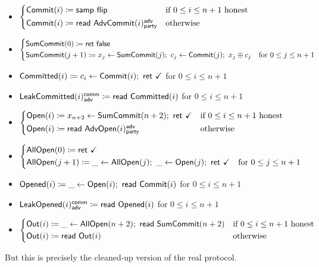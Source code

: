 \begin{itemize}
\item {\color{blue} $\begin{cases*} \Commit(i) \coloneqq \samp{\flip} & \text{if $0 \leq i \leq n+1$ honest} \\ \Commit(i) \coloneqq \read{\AdvCommit(i)^\adv_\party} & \text{otherwise} \end{cases*}$}
\item {\color{blue} $\begin{cases*} \SumCommit(0) \coloneqq \ret{\false} & \\ \SumCommit(j+1) \coloneqq x_j \leftarrow \SumCommit(j); \ c_j \leftarrow \Commit(j); \ x_j \oplus c_j & \text{for $0 \leq j \leq n+1$} \end{cases*}$}
\item {\color{magenta} $\mathsf{Committed}(i) \coloneqq c_i \leftarrow \mathsf{Commit}(i); \ \mathsf{ret} \ \checkmark$ for $0 \leq i \leq n+1$}
\item {\color{magenta} $\mathsf{LeakCommitted}(i)^{\mathsf{comm}}_{\mathsf{adv}} \coloneqq \mathsf{read} \ \mathsf{Committed}(i)$ for $0 \leq i \leq n+1$}
\item {\color{teal} $\begin{cases*} \Open(i) \coloneqq x_{n+2} \leftarrow \SumCommit(n+2); \ \ret{\checkmark} & \text{if $0 \leq i \leq n+1$ honest} \\ \Open(i) \coloneqq \read{\AdvOpen(i)^\adv_\party} & \text{otherwise} \end{cases*}$}
\item {\color{teal} $\begin{cases*} \AllOpen(0) \coloneqq \ret{\checkmark} & \\ \AllOpen(j+1) \coloneqq \_ \leftarrow \AllOpen(j); \ \_ \leftarrow \Open(j); \ \ret{\checkmark} & \text{for $0 \leq j \leq n+1$} \end{cases*}$}
\item {\color{red} $\mathsf{Opened}(i) \coloneqq \_ \leftarrow \mathsf{Open}(i); \ \mathsf{read} \ \mathsf{Commit}(i)$ for $0 \leq i \leq n+1$}
\item {\color{red} $\mathsf{LeakOpened}(i)^{\mathsf{comm}}_{\mathsf{adv}} \coloneqq \mathsf{read} \ \mathsf{Opened}(i)$ for $0 \leq i \leq n+1$}
\item $\begin{cases*} \Out(i) \coloneqq \_ \leftarrow \AllOpen(n+2); \ \read{\SumCommit(n+2)} & \text{if $0 \leq i \leq n+1$ honest} \\ \Out(i) \coloneqq \read{\Out(i)} & \text{otherwise} \end{cases*}$
\end{itemize}

\noindent But this is precisely the cleaned-up version of the real protocol.